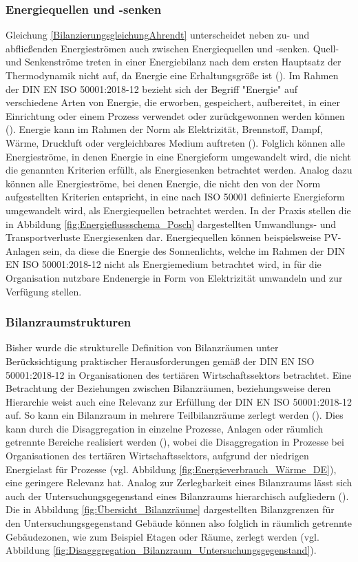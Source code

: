 \subsubsection{Energiequellen und -senken}
Gleichung \eqref{BilanzierungsgleichungAhrendt} unterscheidet neben zu- und abfließenden Energieströmen auch zwischen Energiequellen und -senken.
Quell- und Senkenströme treten in einer Energiebilanz nach dem ersten Hauptsatz der Thermodynamik nicht auf, da Energie eine Erhaltungsgröße ist (\cite[S. 14]{Ahrendts.2014}).
Im Rahmen der DIN EN ISO 50001:2018-12 bezieht sich der Begriff "Energie" auf verschiedene Arten von Energie, die erworben, gespeichert, aufbereitet, in einer Einrichtung oder einem Prozess verwendet
oder zurückgewonnen werden können (\cite[Kapitel 3.5.1]{DIN50001.2018}). 
Energie kann im Rahmen der Norm als Elektrizität, Brennstoff, Dampf, Wärme, Druckluft oder vergleichbares Medium auftreten (\cite[Kapitel 3.5.1]{DIN50001.2018}).
Folglich können alle Energieströme, in denen Energie in eine Energieform umgewandelt wird, die nicht die genannten Kriterien erfüllt, als Energiesenken betrachtet werden.
Analog dazu können alle Energieströme, bei denen Energie, die nicht den von der Norm aufgestellten Kriterien entspricht, in eine nach ISO 50001 definierte Energieform
umgewandelt wird, als Energiequellen betrachtet werden.
In der Praxis stellen die in Abbildung \eqref{fig:Energieflussschema_Posch} dargestellten Umwandlungs- und Transportverluste Energiesenken dar. 
Energiequellen können beispielsweise
PV-Anlagen sein, da diese die Energie des Sonnenlichts, welche im Rahmen der DIN EN ISO 50001:2018-12 nicht als Energiemedium betrachtet wird, in für die Organisation 
nutzbare Endenergie in Form von Elektrizität umwandeln und zur Verfügung stellen.

\subsubsection{Bilanzraumstrukturen}
Bisher wurde die strukturelle Definition von Bilanzräumen unter Berücksichtigung praktischer Herausforderungen gemäß der DIN EN ISO 50001:2018-12 in Organisationen 
des tertiären Wirtschaftssektors betrachtet. 
Eine Betrachtung der Beziehungen zwischen Bilanzräumen, beziehungsweise deren Hierarchie weist auch eine Relevanz zur Erfüllung der DIN EN ISO 50001:2018-12 auf.
So kann ein Bilanzraum in mehrere Teilbilanzräume zerlegt werden (\cite[S. 310]{Engelmann.2015}). 
Dies kann durch die Disaggregation in einzelne Prozesse, Anlagen oder räumlich getrennte Bereiche realisiert werden (\cite[S. 310]{Engelmann.2015}), 
wobei die Disaggregation in Prozesse bei Organisationen des tertiären Wirtschaftssektors, aufgrund der niedrigen Energielast für Prozesse (vgl. Abbildung \eqref{fig:Energieverbrauch_Wärme_DE}), 
eine geringere Relevanz hat.
Analog zur Zerlegbarkeit eines Bilanzraums lässt sich auch der Untersuchungsgegenstand eines Bilanzraums hierarchisch aufgliedern (\cite[S. 109]{Miller.2016}).
Die in Abbildung \eqref{fig:Übersicht_Bilanzräume} dargestellten Bilanzgrenzen für den Untersuchungsgegenstand Gebäude können also folglich in räumlich getrennte 
Gebäudezonen, wie zum Beispiel Etagen oder Räume, zerlegt werden (vgl. Abbildung \eqref{fig:Disagggregation_Bilanzraum_Untersuchungsgegenstand}).

